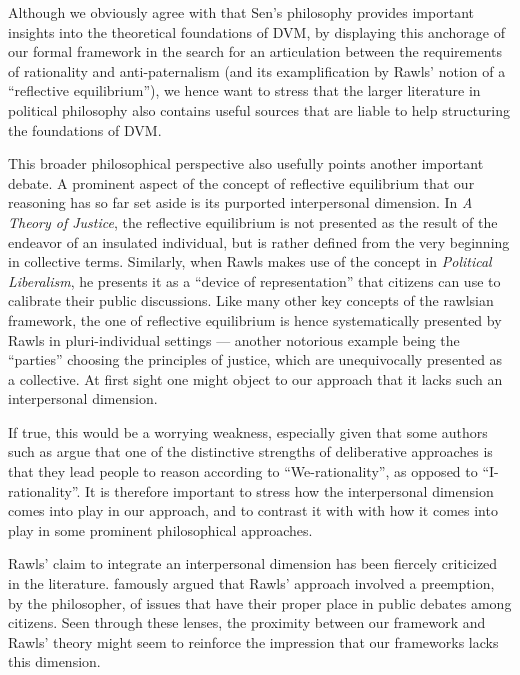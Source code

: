 \documentclass[version=3.21, pagesize, twoside=off, bibliography=totoc, DIV=calc, fontsize=12pt, a4paper, french, english]{scrartcl}
\begin{document}
Although we obviously agree with \citet{bartkowski_beyond_2018} that Sen's philosophy provides important insights into the theoretical foundations of DVM, by displaying this anchorage of our formal framework in the search for an articulation between the requirements of rationality and anti-paternalism (and its examplification by Rawls' notion of a “reflective equilibrium”), we hence want to stress that the larger literature in political philosophy also contains useful sources that are liable to help structuring the foundations of DVM.

This broader philosophical perspective also usefully points another important debate. 
A prominent aspect of the concept of reflective equilibrium that our reasoning has so far set aside is its purported interpersonal dimension. 
In \emph{A Theory of Justice}, the reflective equilibrium is not presented as the result of the endeavor of an insulated individual, but is rather defined from the very beginning in collective terms. 
Similarly, when Rawls makes use of the concept in \emph{Political Liberalism}, he presents it as a  “device of representation” that citizens can use to calibrate their public discussions. 
Like many other key concepts of the rawlsian framework, the one of reflective equilibrium is hence systematically presented by Rawls in pluri-individual settings --- another notorious example being the “parties” choosing the principles of justice, which are unequivocally presented as a collective. 
At first sight one might object to our approach that it lacks such an interpersonal dimension.

If true, this would be a worrying weakness, especially given that some authors such as \citet{vatn_institutional_2009} argue that one of the distinctive strengths of deliberative approaches is that they lead people to reason according to ``We-rationality'', as opposed to ``I-rationality''. 
It is therefore important to stress how the interpersonal dimension comes into play in our approach, and to contrast it with with how it comes into play in some prominent philosophical approaches.

Rawls' claim to integrate an interpersonal dimension has been fiercely criticized in the literature. 
\citet{habermas_short_1999} famously argued that Rawls' approach involved a preemption, by the philosopher, of issues that have their proper place in public debates among citizens. 
Seen through these lenses, the proximity between our framework and Rawls' theory might seem to reinforce the impression that our frameworks lacks this dimension.
\end{document}
